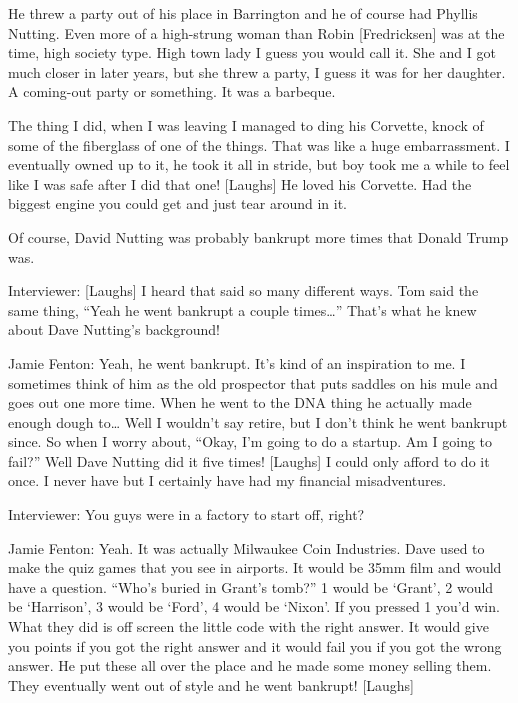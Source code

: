 He threw a party out of his place in Barrington and he of course had Phyllis Nutting. Even more of a high-strung woman than Robin [Fredricksen] was at the time, high society type. High town lady I guess you would call it. She and I got much closer in later years, but she threw a party, I guess it was for her daughter. A coming-out party or something. It was a barbeque.

The thing I did, when I was leaving I managed to ding his Corvette, knock of some of the fiberglass of one of the things. That was like a huge embarrassment. I eventually owned up to it, he took it all in stride, but boy took me a while to feel like I was safe after I did that one! [Laughs] He loved his Corvette. Had the biggest engine you could get and just tear around in it.

Of course, David Nutting was probably bankrupt more times that Donald Trump was.

\textcolor{interviewer}{Interviewer:} [Laughs] I heard that said so many different ways. Tom said the same thing, “Yeah he went bankrupt a couple times…” That’s what he knew about Dave Nutting’s background!

\textcolor{interviewee}{Jamie Fenton:} Yeah, he went bankrupt. It’s kind of an inspiration to me. I sometimes think of him as the old prospector that puts saddles on his mule and goes out one more time. When he went to the DNA thing he actually made enough dough to… Well I wouldn’t say retire, but I don’t think he went bankrupt since. So when I worry about, “Okay, I’m going to do a startup. Am I going to fail?” Well Dave Nutting did it five times! [Laughs] I could only afford to do it once. I never have but I certainly have had my financial misadventures.

\textcolor{interviewer}{Interviewer:} You guys were in a factory to start off, right?

\textcolor{interviewee}{Jamie Fenton:} Yeah. It was actually Milwaukee Coin Industries. Dave used to make the quiz games that you see in airports. It would be 35mm film and would have a question. “Who’s buried in Grant’s tomb?” 1 would be ‘Grant’, 2 would be ‘Harrison’, 3 would be ‘Ford’, 4 would be ‘Nixon’. If you pressed 1 you’d win. What they did is off screen the little code with the right answer. It would give you points if you got the right answer and it would fail you if you got the wrong answer. He put these all over the place and he made some money selling them. They eventually went out of style and he went bankrupt! [Laughs]

